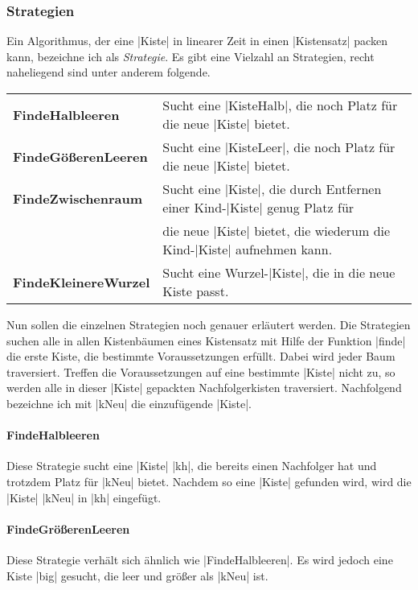 \subsubsection{Strategien}
\label{strats}
 Ein Algorithmus, der eine |Kiste| in linearer Zeit in einen |Kistensatz| packen kann, bezeichne ich als \emph{Strategie}.
 Es gibt eine Vielzahl an Strategien, recht naheliegend sind unter anderem folgende.

\begin{center}
\begin{tabular}{ll}
 \textbf{FindeHalbleeren}    & Sucht eine |KisteHalb|, die noch Platz für die neue |Kiste| bietet. \\
 \textbf{FindeGößerenLeeren} & Sucht eine |KisteLeer|, die noch Platz für die neue |Kiste| bietet. \\
 \textbf{FindeZwischenraum}  & Sucht eine |Kiste|, die durch Entfernen einer Kind-|Kiste| genug Platz für \\
                             & \hfill die neue |Kiste| bietet, die wiederum die Kind-|Kiste| aufnehmen kann. \\
 \textbf{FindeKleinereWurzel}& Sucht eine Wurzel-|Kiste|, die in die neue Kiste passt.      \\
\end{tabular}
\end{center}

 Nun sollen die einzelnen Strategien noch genauer erläutert werden.
 Die Strategien suchen alle in allen Kistenbäumen eines Kistensatz mit Hilfe der Funktion |finde| die erste Kiste,
  die bestimmte Voraussetzungen erfüllt.
 Dabei wird jeder Baum traversiert. Treffen die Voraussetzungen auf eine bestimmte |Kiste| nicht zu,
  so werden alle in dieser |Kiste| gepackten Nachfolgerkisten traversiert.
 Nachfolgend bezeichne ich mit |kNeu| die einzufügende |Kiste|.
\paragraph{FindeHalbleeren}
 Diese Strategie sucht eine |Kiste| |kh|, die bereits einen Nachfolger hat und trotzdem Platz für |kNeu| bietet.
 Nachdem so eine |Kiste| gefunden wird, wird die |Kiste| |kNeu| in |kh| eingefügt.
\paragraph{FindeGrößerenLeeren}
 Diese Strategie verhält sich ähnlich wie |FindeHalbleeren|. Es wird jedoch eine Kiste |big| gesucht, die leer und größer als |kNeu| ist.
